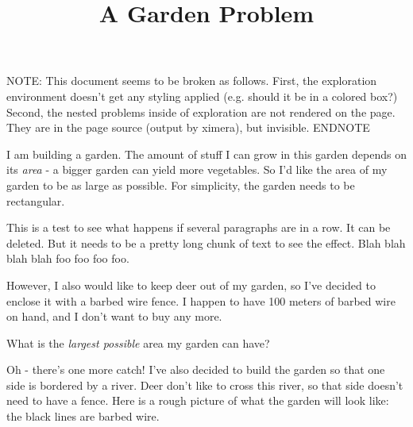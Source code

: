 \documentclass{ximera}
\title{A Garden Problem}
\begin{document}

NOTE: This document seems to be broken as follows. First, the exploration environment doesn't get any styling applied (e.g. should it be in a colored box?) Second, the nested problems inside of exploration are not rendered on the page. They are in the page source (output by ximera), but invisible. ENDNOTE

I am building a garden. The amount of stuff I can grow in this garden depends on its \emph{area} - a bigger garden can yield more vegetables. So I'd like the area of my garden to be as large as possible. For simplicity, the garden needs to be rectangular.

This is a test to see what happens if several paragraphs are in a row. It can be deleted. But it needs to be a pretty long chunk of text to see the effect. Blah blah blah blah foo foo foo foo.

However, I also would like to keep deer out of my garden, so I've decided to enclose it with a barbed wire fence. I happen to have 100 meters of barbed wire on hand, and I don't want to buy any more.

\begin{question}
What is the \emph{largest possible} area my garden can have?
\end{question}

Oh - there's one more catch! I've also decided to build the garden so that one side is bordered by a river. Deer don't like to cross this river, so that side doesn't need to have a fence. Here is a rough picture of what the garden will look like: the black lines are barbed wire.
\end{document}
